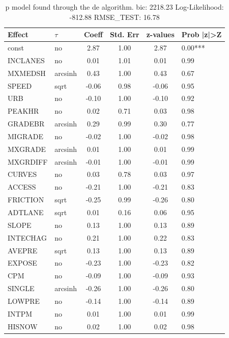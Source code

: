 \begin{table}
	\caption{p model found through the de algorithm. bic: 2218.23 Log-Likelihood: -812.88 RMSE_TEST: 16.78}
	\begin{center}
		\begin{tabular}{|l|l|c|c|c|l|}
			\hline
			Effect & $\tau$ & Coeff & Std. Err & z-values & Prob |z|>Z \\
			\hline
			const & no & 2.87 & 1.00 & 2.87 & 0.00*** \\
			\hline
			INCLANES & no & 0.01 & 1.01 & 0.01 & 0.99 \\
			\hline
			MXMEDSH & arcsinh & 0.43 & 1.00 & 0.43 & 0.67 \\
			\hline
			SPEED & sqrt & -0.06 & 0.98 & -0.06 & 0.95 \\
			\hline
			URB & no & -0.10 & 1.00 & -0.10 & 0.92 \\
			\hline
			PEAKHR & no & 0.02 & 0.71 & 0.03 & 0.98 \\
			\hline
			GRADEBR & arcsinh & 0.29 & 0.99 & 0.30 & 0.77 \\
			\hline
			MIGRADE & no & -0.02 & 1.00 & -0.02 & 0.98 \\
			\hline
			MXGRADE & arcsinh & 0.01 & 1.00 & 0.01 & 0.99 \\
			\hline
			MXGRDIFF & arcsinh & -0.01 & 1.00 & -0.01 & 0.99 \\
			\hline
			CURVES & no & 0.03 & 0.78 & 0.03 & 0.97 \\
			\hline
			ACCESS & no & -0.21 & 1.00 & -0.21 & 0.83 \\
			\hline
			FRICTION & sqrt & -0.25 & 0.99 & -0.26 & 0.80 \\
			\hline
			ADTLANE & sqrt & 0.01 & 0.16 & 0.06 & 0.95 \\
			\hline
			SLOPE & no & 0.13 & 1.00 & 0.13 & 0.89 \\
			\hline
			INTECHAG & no & 0.21 & 1.00 & 0.22 & 0.83 \\
			\hline
			AVEPRE & sqrt & 0.13 & 1.00 & 0.13 & 0.89 \\
			\hline
			EXPOSE & no & -0.23 & 1.00 & -0.23 & 0.82 \\
			\hline
			CPM & no & -0.09 & 1.00 & -0.09 & 0.93 \\
			\hline
			SINGLE & arcsinh & -0.26 & 1.00 & -0.26 & 0.80 \\
			\hline
			LOWPRE & no & -0.14 & 1.00 & -0.14 & 0.89 \\
			\hline
			INTPM & no & 0.01 & 1.00 & 0.01 & 0.99 \\
			\hline
			HISNOW & no & 0.02 & 1.00 & 0.02 & 0.98 \\

\end{tabular}
\end{center}
\end{table}
